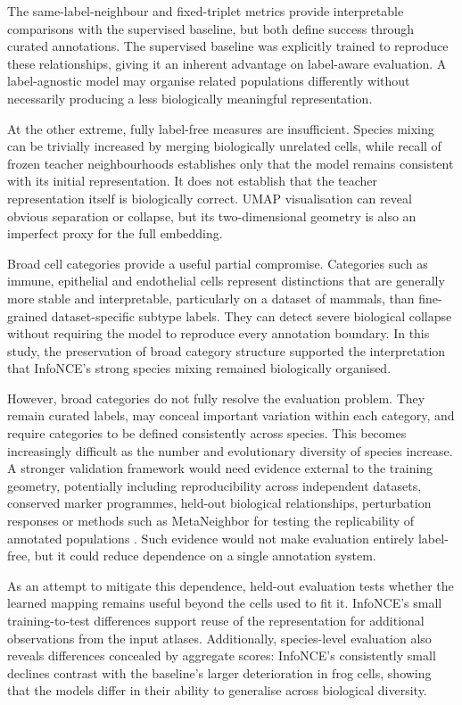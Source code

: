 \documentclass{article}
\begin{document}
The same-label-neighbour and fixed-triplet metrics provide interpretable comparisons with the supervised baseline, but both define success through curated annotations. The supervised baseline was explicitly trained to reproduce these relationships, giving it an inherent advantage on label-aware evaluation. A label-agnostic model may organise related populations differently without necessarily producing a less biologically meaningful representation.

At the other extreme, fully label-free measures are insufficient. Species mixing can be trivially increased by merging biologically unrelated cells, while recall of frozen teacher neighbourhoods establishes only that the model remains consistent with its initial representation. It does not establish that the teacher representation itself is biologically correct. UMAP visualisation can reveal obvious separation or collapse, but its two-dimensional geometry is also an imperfect proxy for the full embedding.

Broad cell categories provide a useful partial compromise. Categories such as immune, epithelial and endothelial cells represent distinctions that are generally more stable and interpretable, particularly on a dataset of mammals, than fine-grained dataset-specific subtype labels. They can detect severe biological collapse without requiring the model to reproduce every annotation boundary. In this study, the preservation of broad category structure supported the interpretation that InfoNCE's strong species mixing remained biologically organised.

However, broad categories do not fully resolve the evaluation problem. They remain curated labels, may conceal important variation within each category, and require categories to be defined consistently across species. This becomes increasingly difficult as the number and evolutionary diversity of species increase. A stronger validation framework would need evidence external to the training geometry, potentially including reproducibility across independent datasets, conserved marker programmes, held-out biological relationships, perturbation responses or methods such as MetaNeighbor for testing the replicability of annotated populations \cite{MetaNeighbour}. Such evidence would not make evaluation entirely label-free, but it could reduce dependence on a single annotation system.

As an attempt to mitigate this dependence, held-out evaluation tests whether the learned mapping remains useful beyond the cells used to fit it. InfoNCE's small training-to-test differences support reuse of the representation for additional observations from the input atlases. Additionally, species-level evaluation also reveals differences concealed by aggregate scores: InfoNCE's consistently small declines contrast with the baseline's larger deterioration in frog cells, showing that the models differ in their ability to generalise across biological diversity.
\end{document}
